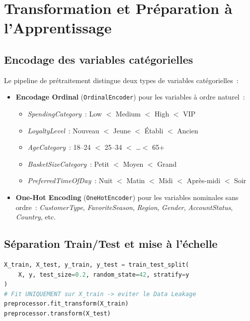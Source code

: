 \documentclass[12pt, a4paper]{article}
\newcommand{\code}[1]{\texttt{\small#1}}
\newcommand{\feat}[1]{\textit{\textcolor{accent}{#1}}}
\begin{document}
\section{Transformation et Préparation à l'Apprentissage}

\subsection{Encodage des variables catégorielles}

Le pipeline de prétraitement distingue deux types de variables catégorielles~:

\begin{itemize}
  \item \textbf{Encodage Ordinal} (\code{OrdinalEncoder}) pour les variables
        à ordre naturel~:
        \begin{itemize}
          \item \feat{SpendingCategory}~: Low $<$ Medium $<$ High $<$ VIP
          \item \feat{LoyaltyLevel}~: Nouveau $<$ Jeune $<$ Établi $<$ Ancien
          \item \feat{AgeCategory}~: 18--24 $<$ 25--34 $<$ \ldots $<$ 65+
          \item \feat{BasketSizeCategory}~: Petit $<$ Moyen $<$ Grand
          \item \feat{PreferredTimeOfDay}~: Nuit $<$ Matin $<$ Midi $<$ Après-midi $<$ Soir
        \end{itemize}
  \item \textbf{One-Hot Encoding} (\code{OneHotEncoder}) pour les variables
        nominales sans ordre~: \feat{CustomerType}, \feat{FavoriteSeason},
        \feat{Region}, \feat{Gender}, \feat{AccountStatus}, \feat{Country}, etc.
\end{itemize}

\subsection{Séparation Train/Test et mise à l'échelle}

\begin{lstlisting}[language=Python]
X_train, X_test, y_train, y_test = train_test_split(
    X, y, test_size=0.2, random_state=42, stratify=y
)
# Fit UNIQUEMENT sur X_train -> eviter le Data Leakage
preprocessor.fit_transform(X_train)
preprocessor.transform(X_test)
\end{lstlisting}
\end{document}
